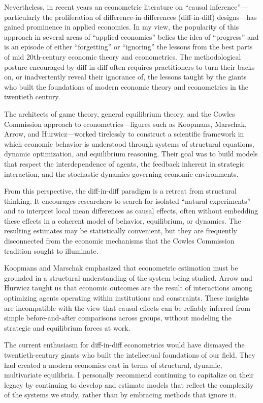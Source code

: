 \documentclass[12pt]{article}
\begin{document}
Nevertheless, in recent years an econometric literature on ``causal inference''---particularly the proliferation of difference-in-differences (diff-in-diff) designs---has gained prominence in applied economics. In my view, the popularity of this approach in several areas of ``applied economics'' belies the idea of ``progress'' and is an episode of either ``forgetting'' or ``ignoring'' the lessons from the best parts of mid 20th-century economic theory and econometrics. The methodological posture encouraged by diff-in-diff often requires practitioners to turn their backs on, or inadvertently reveal their ignorance of, the lessons taught by the giants who built the foundations of modern economic theory and econometrics in the twentieth century.

The architects of game theory, general equilibrium theory, and the Cowles Commission approach to econometrics---figures such as Koopmans, Marschak, Arrow, and Hurwicz---worked tirelessly to construct a scientific framework in which economic behavior is understood through systems of structural equations, dynamic optimization, and equilibrium reasoning. Their goal was to build models that respect the interdependence of agents, the feedback inherent in strategic interaction, and the stochastic dynamics governing economic environments.

From this perspective, the diff-in-diff paradigm is a retreat from structural thinking. It encourages researchers to search for isolated ``natural experiments'' and to interpret local mean differences as causal effects, often without embedding these effects in a coherent model of behavior, equilibrium, or dynamics. The resulting estimates may be statistically convenient, but they are frequently disconnected from the economic mechanisms that the Cowles Commission tradition sought to illuminate.

Koopmans and Marschak emphasized that econometric estimation must be grounded in a structural understanding of the system being studied. Arrow and Hurwicz taught us that economic outcomes are the result of interactions among optimizing agents operating within institutions and constraints. These insights are incompatible with the view that causal effects can be reliably inferred from simple before-and-after comparisons across groups, without modeling the strategic and equilibrium forces at work.

The current enthusiasm for diff-in-diff econometrics would have dismayed the twentieth-century giants who built the intellectual foundations of our field. They had created a modern economics cast in terms of structural, dynamic, multivariate equilibria. I personally recommend continuing to capitalize on their legacy by continuing to develop and estimate models that reflect the complexity of the systems we study, rather than by embracing methods that ignore it.
\end{document}
